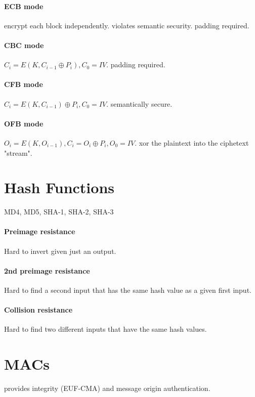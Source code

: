 \documentclass[11pt]{article}
\begin{document}
\paragraph{ECB mode} encrypt each block independently. violates semantic security. padding required.

\paragraph{CBC mode} $C_i = E(K, C_{i-1} \oplus P_i), C_0 = IV$. padding required.

\paragraph{CFB mode} $C_i = E(K, C_{i-1}) \oplus P_i, C_0 = IV$. semantically secure.

\paragraph{OFB mode} $O_i = E(K, O_{i-1}), C_i = O_i \oplus P_i, O_0 = IV$. xor the plaintext into the ciphetext "stream".

\section{Hash Functions} MD4, MD5, SHA-1, SHA-2, SHA-3

\paragraph{Preimage resistance} Hard to invert given just an output.

\paragraph{2nd preimage resistance} Hard to find a second input that has the same hash value as a given first input.

\paragraph{Collision resistance} Hard to find two different inputs that have the same hash values.

\section{MACs} provides integrity (EUF-CMA) and message origin authentication.
\end{document}
